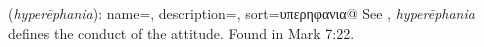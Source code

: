 \item[Haughty disdain,]

(\textit{hyperēphania}):
{
    name=,
    description={},
    sort=υπερηφανια@
}
See , \emph{hyperēphania} defines the conduct of the attitude.
Found in Mark 7:22.
